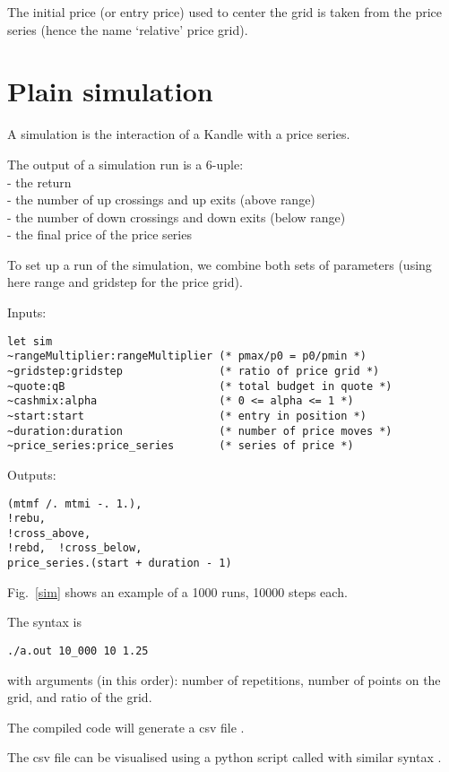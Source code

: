 \documentclass[oneside]{article}
\begin{document}
The initial price (or entry price) 
used to center the grid is taken from the price series (hence the name `relative' price grid).

\section{Plain simulation}
A simulation is the interaction of a Kandle with a price series.

The output of a simulation run is a 6-uple:
\\- the return
\\- the number of up crossings and up exits (above range)
\\- the number of down crossings and down exits (below range)
\\- the final price of the price series

To set up a run of the simulation, 
we combine both sets of parameters (using here range and gridstep for the price grid).

Inputs:
\begin{verbatim}
let sim 
~rangeMultiplier:rangeMultiplier (* pmax/p0 = p0/pmin *)
~gridstep:gridstep               (* ratio of price grid *)
~quote:qB                        (* total budget in quote *)
~cashmix:alpha                   (* 0 <= alpha <= 1 *)
~start:start                     (* entry in position *)
~duration:duration               (* number of price moves *)
~price_series:price_series       (* series of price *)
\end{verbatim}

Outputs:
\begin{verbatim}
(mtmf /. mtmi -. 1.), 
!rebu, 
!cross_above, 
!rebd,  !cross_below, 
price_series.(start + duration - 1)
\end{verbatim}

Fig.~\ref{sim} shows an example of a 1000 runs, 10000 steps each. 

The syntax is
\begin{verbatim}
./a.out 10_000 10 1.25
\end{verbatim}
with arguments (in this order): number of repetitions, number of points on the grid, and ratio of the grid. 

The compiled code will generate a csv file . 

The csv file can be visualised using a python script called  with similar syntax .
\end{document}
